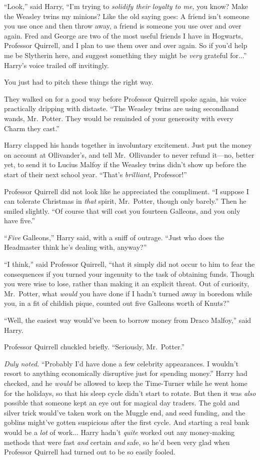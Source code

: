 “Look,” said Harry, “I’m trying to \emph{solidify their loyalty to me,} you know? Make the Weasley twins my minions? Like the old saying goes: A friend isn’t someone you use once and then throw away, a friend is someone you use over and over again. Fred and George are two of the most useful friends I have in Hogwarts, Professor Quirrell, and I plan to use them over and over again. So if you’d help me be Slytherin here, and suggest something they might be \emph{very} grateful for...” Harry’s voice trailed off invitingly.

You just had to pitch these things the right way.

They walked on for a good way before Professor Quirrell spoke again, his voice practically dripping with distaste. “The Weasley twins are using secondhand wands, Mr.~Potter. They would be reminded of your generosity with every Charm they cast.”

Harry clapped his hands together in involuntary excitement. Just put the money on account at Ollivander’s, and tell Mr.~Ollivander to never refund it—no, better yet, to send it to Lucius Malfoy if the Weasley twins didn’t show up before the start of their next school year. “That’s \emph{brilliant}, Professor!”

Professor Quirrell did not look like he appreciated the compliment. “I suppose I can tolerate Christmas in \emph{that} spirit, Mr.~Potter, though only barely.” Then he smiled slightly. “Of course that will cost you fourteen Galleons, and you only have five.”

“\emph{Five} Galleons,” Harry said, with a sniff of outrage. “Just who does the Headmaster think he’s dealing with, anyway?”

“I think,” said Professor Quirrell, “that it simply did not occur to him to fear the consequences if you turned your ingenuity to the task of obtaining funds. Though you were wise to lose, rather than making it an explicit threat. Out of curiosity, Mr.~Potter, what \emph{would} you have done if I hadn’t turned away in boredom while you, in a fit of childish pique, counted out five Galleons worth of Knuts?”

“Well, the easiest way would’ve been to borrow money from Draco Malfoy,” said Harry.

Professor Quirrell chuckled briefly. “Seriously, Mr.~Potter.”

\emph{Duly noted.} “Probably I’d have done a few celebrity appearances. I wouldn’t resort to anything economically disruptive just for spending money.” Harry had checked, and he \emph{would} be allowed to keep the Time-Turner while he went home for the holidays, so that his sleep cycle didn’t start to rotate. But then it was \emph{also} possible that someone kept an eye out for magical day traders. The gold and silver trick would’ve taken work on the Muggle end, and seed funding, and the goblins might’ve gotten suspicious after the first cycle. And starting a real bank would be a \emph{lot} of work... Harry hadn’t \emph{quite} worked out any money-making methods that were fast \emph{and} certain \emph{and} safe, so he’d been very glad when Professor Quirrell had turned out to be so easily fooled.


